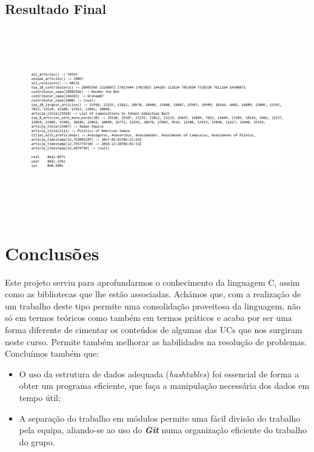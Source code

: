 \documentclass[a4paper]{article}
\begin{document}
\subsection{Resultado Final}

\begin{figure}[htbp]
    \centering
    \includegraphics[width = 420pt, height = 230pt]{output}
\end{figure}

\section{Conclusões}
\label{sec:conclusao}
Este projeto serviu para aprofundarmos o conhecimento da linguagem C, assim como as bibliotecas que lhe estão associadas. Achámos que, com a realização de um trabalho deste tipo permite uma consolidação proveitosa da linguagem, não só em termos teóricos como também em termos práticos e acaba por ser uma forma diferente de cimentar os conteúdos de algumas das UCs que nos surgiram neste curso. Permite também melhorar as habilidades na resolução de problemas. Concluímos também que:

\begin{itemize}
        \item O uso da estrutura de dados adequada (\textit{hashtables}) foi essencial de forma a obter um programa eficiente, que faça a manipulação necessária dos dados em tempo útil;
 	    \item A separação do trabalho em módulos permite uma fácil divisão do trabalho pela equipa, aliando-se ao uso do \textbf{\textit{Git}} numa organização eficiente do trabalho do grupo.
\end{itemize}
\end{document}
